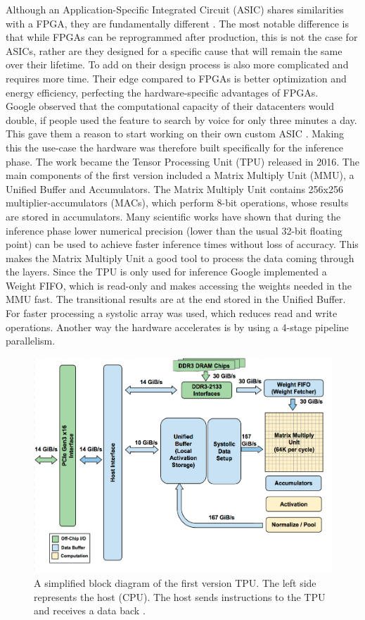 \documentclass[conference]{IEEEtran}
\begin{document}
	Although an Application-Specific Integrated Circuit (ASIC) shares similarities with a FPGA, they are fundamentally different \cite{capra2020updated}. The most notable difference is that while FPGAs can be reprogrammed after production, this is not the case for ASICs, rather are they designed for a specific cause that will remain the same over their lifetime. To add on their design process is also more complicated and requires more time. Their edge compared to FPGAs is better optimization and energy efficiency, perfecting the hardware-specific advantages of FPGAs.
	\\
	Google observed that the computational capacity of their datacenters would double, if people used the feature to search by voice for only three minutes a day. This gave them a reason to start working on their own custom ASIC \cite{jouppi2017datacenter}. Making this the use-case the hardware was therefore built specifically for the inference phase. The work became the Tensor Processing Unit (TPU) released in 2016. The main components of the first version included a Matrix Multiply Unit (MMU), a Unified Buffer and Accumulators. The Matrix Multiply Unit contains 256x256 multiplier-accumulators (MACs), which perform 8-bit operations, whose results are stored in accumulators. Many scientific works have shown that during the inference phase lower numerical precision (lower than the usual 32-bit floating point) can be used to achieve faster inference times without loss of accuracy\cite{rodriguez2018lower}. This makes the Matrix Multiply Unit a good tool to process the data coming through the layers. Since the TPU is only used for inference Google implemented a Weight FIFO, which is read-only and makes accessing the weights needed in the MMU fast. The transitional results are at the end stored in the Unified Buffer. For faster processing a systolic array was used, which reduces read and write operations. 
	Another way the hardware accelerates is by using a 4-stage pipeline parallelism.
	\begin{figure}[h]
		\centering
		\includegraphics[width=\linewidth]{pictures/tpu_floorplan.png}
		\caption{A simplified block diagram of the first version TPU. The left side represents the host (CPU). The host sends instructions to the TPU and receives a data back \cite{jouppi2017datacenter}.}
	\end{figure}
\end{document}
